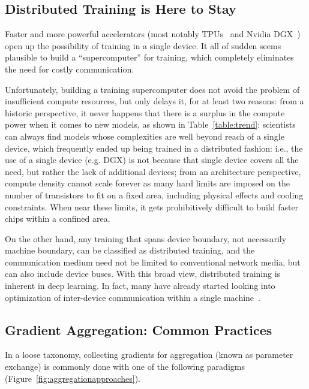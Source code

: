 \subsection{Distributed Training is Here to Stay}
Faster and more powerful accelerators (most notably TPUs~\cite{Jouppi:2017:IPA:3079856.3080246} and Nvidia DGX~\cite{AIResear61:online}) open up the possibility of training in a single device. It all of sudden seems plausible to build a ``supercomputer'' for training, which completely eliminates the need for costly communication. 

Unfortunately, building a training supercomputer does not avoid the problem of insufficient compute resources, but only delays it, for at least two reasons: from a historic perspective, it never happens that there is a surplus in the compute power when it comes to new models, as shown in Table~\ref{table:trend}: scientists can always find models whose complexities are well beyond reach of a single device, which frequently ended up being trained in a distributed fashion: i.e., the use of a single device (e.g. DGX) is not because that single device covers all the need, but rather the lack of additional devices; from an architecture perspective, compute density cannot scale forever as many hard limits are imposed on the number of transistors to fit on a fixed area, including physical effects and cooling constraints. When near these limits, it gets prohibitively difficult to build faster chips within a confined area. 

On the other hand, any training that spans device boundary, not necessarily machine boundary, can be classified as distributed training, and the communication medium need not be limited to conventional network media, but can also include device buses. With this broad view, distributed training is inherent in deep learning. In fact, many have already started looking into optimization of inter-device communication within a single machine~\cite{wang2019blink}. %

\subsection{Gradient Aggregation: Common Practices}
In a loose taxonomy, collecting gradients for aggregation (known as parameter exchange) is commonly done with one of the following paradigms (Figure~\ref{fig:aggregationapproaches}).


